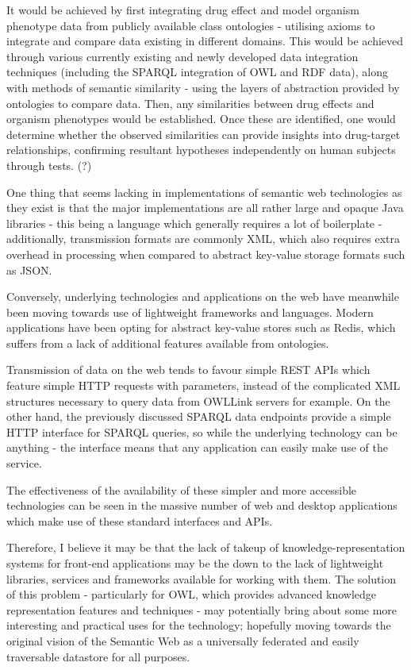 \documentclass{article}
\begin{document}
It would be achieved by first integrating drug effect and model organism
phenotype data from publicly available class ontologies - utilising axioms to
integrate and compare data existing in different domains. This would be achieved
through various currently existing and  newly developed data integration techniques 
(including the SPARQL integration of OWL and RDF data), along with methods of
semantic similarity - using the layers of abstraction provided by ontologies
to compare data. Then, any similarities between drug effects and organism
phenotypes would be established. Once these are identified, one would determine 
whether the observed similarities can provide insights into drug-target relationships, 
confirming resultant hypotheses independently on human subjects through tests.
(?)


One thing that seems lacking in implementations of semantic web technologies as
they exist is that the major implementations are all rather large and opaque
Java libraries - this being a language which generally requires a lot of
boilerplate - additionally, transmission formats are commonly XML, which also
requires extra overhead in processing when compared to abstract key-value
storage formats such as JSON. 

Conversely, underlying technologies and applications on the web have meanwhile 
been moving towards use of lightweight frameworks and languages. Modern applications 
have been opting for abstract key-value stores such as Redis, which suffers from
a lack of additional features available from ontologies. 

Transmission of data on the web tends to favour simple REST APIs which feature 
simple HTTP requests with parameters, instead of the complicated XML structures 
necessary to query data from OWLLink servers for example. On the other hand, the
previously discussed SPARQL data endpoints provide a simple HTTP interface for
SPARQL queries, so while the underlying technology can be anything - the
interface means that any application can easily make use of the service.

The effectiveness of the availability of these simpler and more accessible 
technologies can be seen in the massive number of web and desktop applications
which make use of these standard interfaces and APIs.

Therefore, I believe it may be that the lack of takeup of knowledge-representation systems
for front-end applications may be the down to the lack of lightweight libraries, 
services and frameworks available for working with them. The solution of this
problem - particularly for OWL, which provides advanced knowledge representation
features and techniques - may potentially bring about some more interesting and
practical uses for the technology; hopefully moving towards the original vision
of the Semantic Web as a universally federated and easily traversable datastore
for all purposes.
\end{document}
